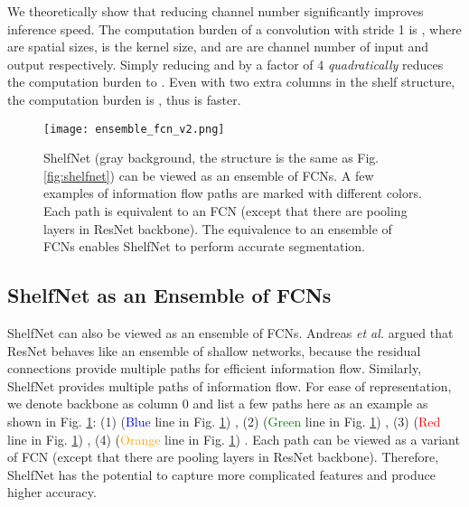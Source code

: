 \documentclass[10pt,twocolumn,letterpaper]{article}
\begin{document}
We theoretically show that reducing channel number significantly improves inference speed. The computation burden of a convolution with stride 1 is , where  are spatial sizes,  is the kernel size, and  are  are channel number of input and output respectively. Simply reducing  and  by a factor of 4 \textit{quadratically} reduces the computation burden to . Even with two extra columns in the shelf structure, the computation burden is , thus is faster.

































\begin{figure}[!htb]
    \centering
    \texttt{[image: ensemble\_fcn\_v2.png]}
        \caption{\small{ShelfNet (gray background, the structure is the same as Fig. \ref{fig:shelfnet}) can be viewed as an ensemble of FCNs. A few examples of information flow paths are marked with different colors. Each path is equivalent to an FCN (except that there are pooling layers in ResNet backbone). The equivalence to an ensemble of FCNs enables ShelfNet to perform accurate segmentation.}
        }
    \label{ensemble}
\end{figure} 







\subsection{ShelfNet as an Ensemble of FCNs}
\label{sec:fcn_ensemble}

ShelfNet can also be viewed as an ensemble of FCNs. Andreas \textit{et al.} \cite{veit2016residual} argued that ResNet behaves like an ensemble of shallow networks, because the residual connections provide multiple paths for efficient information flow.  Similarly, ShelfNet provides multiple paths of information flow. For ease of representation, we denote backbone as column 0 and list a few paths here as an example as shown in Fig. \ref{ensemble}: (1) (\textcolor{blue}{Blue} line in Fig. \ref{ensemble}) \textcolor{blue}{  }, (2) (\textcolor{green}{Green} line in Fig. \ref{ensemble}) \textcolor{green}{ }, (3) (\textcolor{red}{Red} line in Fig. \ref{ensemble})\textcolor{red}{ }, (4) (\textcolor{orange}{Orange} line in Fig. \ref{ensemble}) \textcolor{orange}{}. Each path can be viewed as a variant of FCN (except that there are pooling layers in ResNet backbone).  Therefore, ShelfNet has the potential to capture more complicated features and produce higher accuracy.
\end{document}
